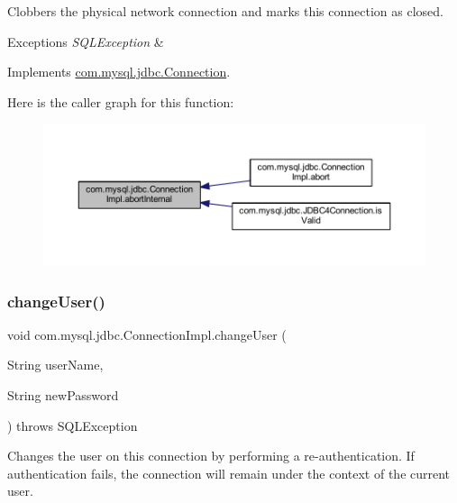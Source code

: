 Clobbers the physical network connection and marks this connection as closed.


\begin{DoxyExceptions}{Exceptions}
{\em S\+Q\+L\+Exception} & \\
\hline
\end{DoxyExceptions}


Implements \mbox{\hyperlink{interfacecom_1_1mysql_1_1jdbc_1_1_connection}{com.\+mysql.\+jdbc.\+Connection}}.

Here is the caller graph for this function\+:\nopagebreak
\begin{figure}[H]
\begin{center}
\leavevmode
\includegraphics[width=350pt]{classcom_1_1mysql_1_1jdbc_1_1_connection_impl_a551f5ee36eb1b4f78304057f63636243_icgraph}
\end{center}
\end{figure}
\mbox{\label{classcom_1_1mysql_1_1jdbc_1_1_connection_impl_a60c2e281bd048fd455dcd75f2c968c27}} 
\subsubsection{\texorpdfstring{change\+User()}{changeUser()}}
{\footnotesize\ttfamily void com.\+mysql.\+jdbc.\+Connection\+Impl.\+change\+User (\begin{DoxyParamCaption}\item[{String}]{user\+Name,  }\item[{String}]{new\+Password }\end{DoxyParamCaption}) throws S\+Q\+L\+Exception}

Changes the user on this connection by performing a re-\/authentication. If authentication fails, the connection will remain under the context of the current user.


